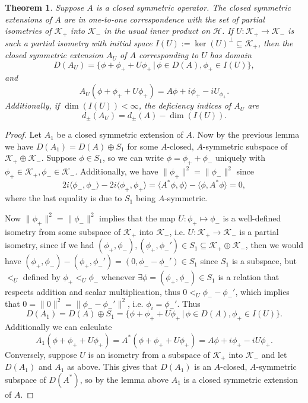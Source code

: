\documentclass[12pt,oneside]{report}
\newtheorem{thm}{Theorem}[chapter]
\begin{document}
\begin{thm}
    Suppose $A$ is a closed symmetric operator. The closed symmetric extensions of $A$ are in one-to-one correspondence with the set of partial isometries of $\mathscr{K}_{+}$ into $\mathscr{K}_{-}$ in the usual inner product on $\mathscr{H}$. If $U: \mathscr{K}_{+} \to \mathscr{K}_{-}$ is such a partial isometry with initial space $I(U) := \ker(U)^{\perp} \subseteq \mathscr{K}_{+}$, then the closed symmetric extension $A_{U}$ of $A$ corresponding to $U$ has domain $$D(A_{U}) = \{ \phi + \phi_{+} + U\phi_{+} \, | \, \phi \in D(A), \phi_{+} \in I(U) \},$$and $$A_{U}(\phi + \phi_{+} + U\phi_{+}) = A\phi + i\phi_{+} - iU_{\phi_{+}}.$$Additionally, if $\dim(I(U)) < \infty$, the deficiency indices of $A_{U}$ are $$d_{\pm}(A_{U}) = d_{\pm}(A) - \dim(I(U)).$$
\end{thm}
\begin{proof}
    Let $A_{1}$ be a closed symmetric extension of $A$. Now by the previous lemma we have $D(A_{1}) = D(A) \oplus S_{1}$ for some $A$-closed, $A$-symmetric subspace of $\mathscr{K}_{+} \oplus \mathscr{K}_{-}$. Suppose $\phi \in S_{1}$, so we can write $\phi = \phi_{+} + \phi_{-}$ uniquely with $\phi_{+} \in \mathscr{K}_{+}, \phi_{-} \in \mathscr{K}_{-}$. Additionally, we have $\|\phi_{+}\|^{2} = \|\phi_{-}\|^{2}$ since $$2i\langle\phi_{-},\phi_{-}\rangle - 2i\langle\phi_{+},\phi_{+}\rangle = \langle A^{*}\phi,\phi \rangle - \langle\phi,A^{*}\phi \rangle = 0,$$ where the last equality is due to $S_{1}$ being $A$-symmetric.

    Now $\|\phi_{+}\|^{2} = \|\phi_{-}\|^{2}$ implies that the map $U: \phi_{+} \mapsto \phi_{-}$ is a well-defined isometry from some subspace of $\mathscr{K}_{+}$ into $\mathscr{K}_{-}$, i.e. $U: \mathscr{K}_{+} \to \mathscr{K}_{-}$ is a partial isometry, since if we had $(\phi_{+},\phi_{-}), (\phi_{+},\phi_{-}') \in S_{1} \subseteq \mathscr{K}_{+} \oplus \mathscr{K}_{-}$, then we would have $(\phi_{+},\phi_{-}) - (\phi_{+}, \phi_{-}') = (0, \phi_{-} - \phi_{-}') \in S_{1}$ since $S_{1}$ is a subspace, but $<_{U}$ defined by $\phi_{+} <_{U} \phi_{-}$ whenever $\exists \phi = (\phi_{+},\phi_{-}) \in S_{1}$ is a relation that respects addition and scalar multiplication, thus $0 <_{U} \phi_{-} - \phi_{-}'$, which implies that $0 = \|0\|^{2} = \|\phi_{-}-\phi_{-}'\|^{2}$, i.e. $\phi_{i} = \phi_{-}'$. Thus $$D(A_{1}) = D(A) \oplus S_{1} = \{ \phi + \phi_{+} + U\phi_{+} \, | \, \phi \in D(A), \phi_{+} \in I(U) \}.$$ Additionally we can calculate $$A_{1}(\phi+\phi_{+}+U\phi_{+}) = A^{*}(\phi+\phi_{+}+U\phi_{+}) = A\phi + i\phi_{+} - iU\phi_{+}.$$
    Conversely, suppose $U$ is an isometry from a subspace of $\mathscr{K}_{+}$ into $\mathscr{K}_{-}$ and let $D(A_{1})$ and $A_{1}$ as above. This gives that $D(A_{1})$ is an $A$-closed, $A$-symmetric subspace of $D(A^{*})$, so by the lemma above $A_{1}$ is a closed symmetric extension of $A$.


\end{proof}
\end{document}
